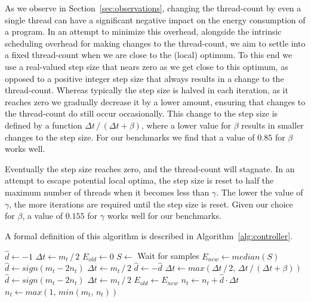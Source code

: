 \documentclass[runningheads]{llncs}
\begin{document}
As we observe in Section~\ref{sec:observations}, changing the thread-count by even a single thread can have a significant negative impact on the energy consumption of a program.
In an attempt to minimize this overhead, alongside the intrinsic scheduling overhead for making changes to the thread-count, we aim to settle into a fixed thread-count when we are close to the (local) optimum.
To this end we use a real-valued step size that nears zero as we get close to this optimum, as opposed to a positive integer step size that always results in a change to the thread-count.
Whereas typically the step size is halved in each iteration, as it reaches zero we gradually decrease it by a lower amount, ensuring that changes to the thread-count do still occur occasionally.
This change to the step size is defined by a function $\Delta t\, /\, (\Delta t + \beta)$, where a lower value for $\beta$ results in smaller changes to the step size.
For our benchmarks we find that a value of $0.85$ for $\beta$ works well.

Eventually the step size reaches zero, and the thread-count will stagnate.
In an attempt to escape potential local optima, the step size is reset to half the maximum number of threads when it becomes less than $\gamma$.
The lower the value of $\gamma$, the more iterations are required until the step size is reset.
Given our choice for $\beta$, a value of $0.155$ for $\gamma$ works well for our benchmarks.

A formal definition of this algorithm is described in Algorithm~\ref{alg:controller}.

\begin{algorithm}
  \begin{algorithmic}[1]
    \State $\hat{d} \gets -1$
    \State $\Delta t \gets m_t\, /\, 2$
    \State $E_{old} \gets 0$
    \Loop
      \State $S \gets$ Wait for samples
      \State $E_{new} \gets median(S)$
        \State $\hat{d} \gets sign(m_t - 2 n_t)$
        \State $\Delta t \gets m_t\, /\, 2$
      \Else
          \State $\hat{d} \gets -\hat{d}$
        \EndIf
          \State $\Delta t \gets max(\Delta t\, /\, 2,\, \Delta t\, /\, (\Delta t + \beta))$
        \Else
          \State $\hat{d} \gets sign(m_t - 2 n_t)$
          \State $\Delta t \gets m_t\, /\, 2$
        \EndIf
      \EndIf
      \State $E_{old} \gets E_{new}$
      \State $n_t \gets n_t + \hat{d} \cdot \Delta t$
      \State $n_t \gets max(1,\, min(m_t,\, n_t))$
    \EndLoop
  \end{algorithmic}%
  \caption{Algorithm for repeatedly updating the thread-count $n_t$ based on energy measurements
  $S$, using step direction $\hat{d}$ and step size $\Delta t$.}
  \label{alg:controller}
\end{algorithm}
\end{document}

